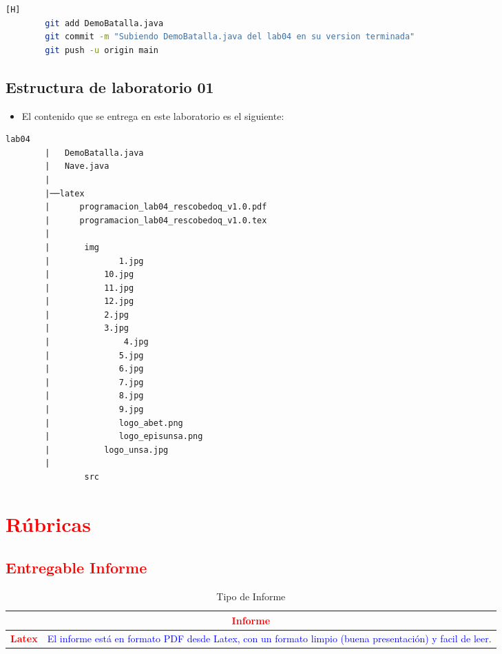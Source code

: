 \documentclass{article}
\begin{document}
	\begin{lstlisting}[language=bash,caption={Commit: "Subiendo DemoBatalla.java del lab04 en su version terminada" }][H]
		git add DemoBatalla.java
		git commit -m "Subiendo DemoBatalla.java del lab04 en su version terminada"
		git push -u origin main
	\end{lstlisting}
	
	
		\subsection{Estructura de laboratorio 01}
	\begin{itemize}	
		\item El contenido que se entrega en este laboratorio es el siguiente:
	\end{itemize}
	
	\begin{lstlisting}[style=ascii-tree]
		lab04
		|   DemoBatalla.java
		|   Nave.java
		|
		|──latex
		|      programacion_lab04_rescobedoq_v1.0.pdf
		|      programacion_lab04_rescobedoq_v1.0.tex
		|     
		|	    img
		|       	   1.jpg
		|        	10.jpg
		|        	11.jpg
		|        	12.jpg
		|        	2.jpg
		|        	3.jpg
		|		     	4.jpg	
		|       	   5.jpg
		|       	   6.jpg
		|       	   7.jpg
		|       	   8.jpg
		|       	   9.jpg
		|       	   logo_abet.png
		|       	   logo_episunsa.png
		|      		logo_unsa.jpg
		|
				src
	\end{lstlisting} 
	
	
	
	
	
	
	\section{\textcolor{red}{Rúbricas}}
	
	\subsection{\textcolor{red}{Entregable Informe}}
	\begin{table}[H]
		\caption{Tipo de Informe}
		\setlength{\tabcolsep}{0.5em} %
		{\renewcommand{\arraystretch}{1.5}%
			\begin{tabular}{|p{3cm}|p{12cm}|}
				\hline
				\multicolumn{2}{|c|}{\textbf{\textcolor{red}{Informe}}}  \\
				\hline 
				\textbf{\textcolor{red}{Latex}} & \textcolor{blue}{El informe está en formato PDF desde Latex,  con un formato limpio (buena presentación) y facil de leer.}   \\ 
				\hline 
				
				
			\end{tabular}
		}
	\end{table}
	
\end{document}
